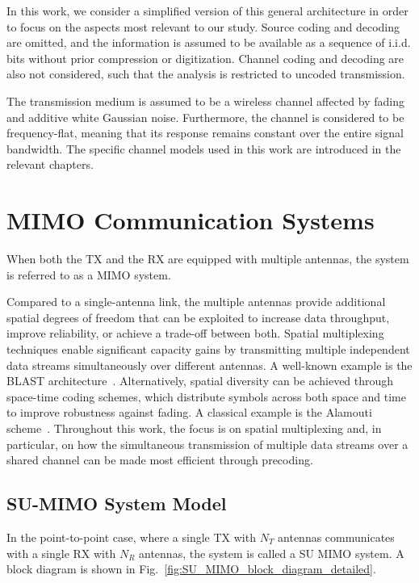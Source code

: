 In this work, we consider a simplified version of this general architecture in order to focus on the aspects most relevant to our study.
Source coding and decoding are omitted, and the information is assumed to be available as a sequence of \ac{i.i.d.} bits without prior compression or digitization.
Channel coding and decoding are also not considered, such that the analysis is restricted to uncoded transmission.

The transmission medium is assumed to be a wireless channel affected by fading and additive white Gaussian noise. Furthermore, the channel is considered to be frequency-flat, meaning that its response remains constant over the entire signal bandwidth. The specific channel models used in this work are introduced in the relevant chapters.


\section{MIMO Communication Systems}

When both the \ac{TX} and the \ac{RX} are equipped with multiple antennas, the system is referred to as a \ac{MIMO} system.

Compared to a single-antenna link, the multiple antennas provide additional spatial degrees of freedom that can be exploited to increase data throughput, improve reliability, or achieve a trade-off between both.
Spatial multiplexing techniques enable significant capacity gains by transmitting multiple independent data streams simultaneously over different antennas. A well-known example is the BLAST architecture~\cite{foschini_1998}.
Alternatively, spatial diversity can be achieved through space-time coding schemes, which distribute symbols across both space and time to improve robustness against fading. A classical example is the Alamouti scheme~\cite{alamouti_1998}.
Throughout this work, the focus is on spatial multiplexing and, in particular, on how the simultaneous transmission of multiple data streams over a shared channel can be made most efficient through precoding.

\subsection{SU-MIMO System Model}

In the point-to-point case, where a single \ac{TX} with $N_T$ antennas communicates with a single \ac{RX} with $N_R$ antennas, the system is called a \ac{SU} \ac{MIMO} system. A block diagram is shown in Fig.~\ref{fig:SU_MIMO_block_diagram_detailed}.


